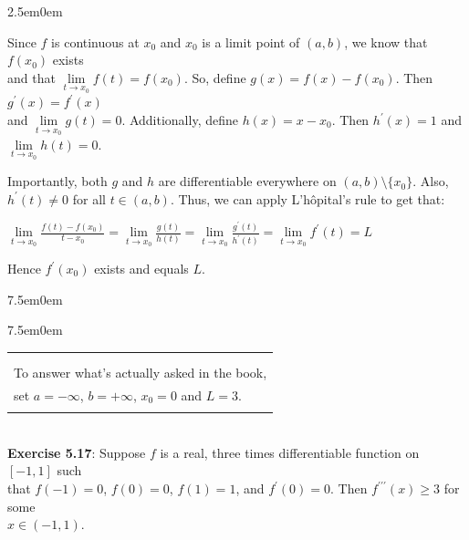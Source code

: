 \documentclass{book}
\newcommand{\pracTwo}{
   \color{Orange}%
   \fontsize{12}{14}\selectfont%
}
\newenvironment{myIndent}{%
   \begin{adjustwidth}{2.5em}{0em}%
}{%
   \end{adjustwidth}%
}
\newenvironment{myTindent}{%
   \begin{adjustwidth}{7.5em}{0em}%
}{%
   \end{adjustwidth}%
}
\newcommand{\ppprime}{{\prime\prime\prime}}
\newcommand{\mySepTwo}[1][.]{%
   {\noindent\color{#1}{\rule{6.5in}{0.5mm}}}\\%
}
\newenvironment{myClosureOne}[2][.]{%
   \color{#1}%
   \begin{tabular}{|p{#2in}|} \hline \\%
}{%
   \\ \hline \end{tabular}%
}
\newcommand{\retTwo}{\hfill\bigbreak}
\begin{document}
{\begin{myIndent}\pracTwo
   Since $f$ is continuous at $x_0$ and $x_0$ is a limit point of $(a, b)$,  we know that $f(x_0)$ exists\\ [5pt] and that $\lim\limits_{t \rightarrow x_0}f(t) = f(x_0)$. So, define $g(x) = f(x) - f(x_0)$. Then $g^\prime(x) = f^\prime(x)$\\ [-1pt] and $\lim\limits_{t\rightarrow x_0}g(t) = 0$. Additionally, define $h(x) = x - x_0$. Then $h^\prime(x) = 1$ and\\ [-1pt] $\lim\limits_{t\rightarrow x_0}h(t) = 0$.\retTwo

   Importantly, both $g$ and $h$ are differentiable everywhere on $(a, b)\setminus \{x_0\}$. Also,\\ [3pt] $h^\prime(t) \neq 0$ for all $t \in (a, b)$. Thus, we can apply L'hôpital's rule to get that:

   {\center $ \lim\limits_{t\rightarrow x_0}\frac{f(t) - f(x_0)}{t - x_0} = \lim\limits_{t\rightarrow x_0}\frac{g(t)}{h(t)} = \lim\limits_{t\rightarrow x_0}\frac{g^\prime(t)}{h^\prime(t)} = \lim\limits_{t\rightarrow x_0}f^\prime(t) = L$\par}

   \newpage

   Hence $f^\prime(x_0)$ exists and equals $L$.
   
   \begin{myTindent}\begin{myTindent}
      
      \begin{myClosureOne}{3}
         \\ [-24pt] To answer what's actually asked in the book,\\ set $a = -\infty$, $b = +\infty$, $x_0 = 0$ and $L = 3$.\\ [-12pt]
      \end{myClosureOne}\retTwo
   \end{myTindent}\end{myTindent}
\end{myIndent}}

\mySepTwo[Black]

\textbf{Exercise 5.17}: Suppose $f$ is a real, three times differentiable  function on $[-1, 1]$ such\\ that $f(-1) = 0$, $f(0) = 0$, $f(1) = 1$, and $f^\prime(0) = 0$. Then $f^\ppprime(x) \geq 3$ for some\\ $x \in (-1, 1)$.\\ [-6pt]
\end{document}
